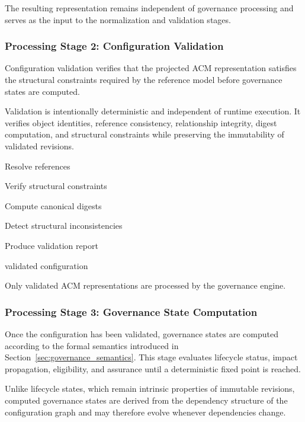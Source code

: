 \documentclass[10pt]{article}
\begin{document}
The resulting representation remains independent of governance processing and serves as the input to the normalization and validation stages.

\subsubsection{Processing Stage 2: Configuration Validation}

Configuration validation verifies that the projected ACM representation satisfies the structural constraints required by the reference model before governance states are computed.

Validation is intentionally deterministic and independent of runtime execution. It verifies object identities, reference consistency, relationship integrity, digest computation, and structural constraints while preserving the immutability of validated revisions.

\begin{algorithm}[ht]
\caption{Configuration Validation}

Resolve references\;

Verify structural constraints\;

Compute canonical digests\;

Detect structural inconsistencies\;

Produce validation report\;

\Return validated configuration\;

\end{algorithm}

Only validated ACM representations are processed by the governance engine.

\subsubsection{Processing Stage 3: Governance State Computation}

Once the configuration has been validated, governance states are computed according to the formal semantics introduced in Section~\ref{sec:governance_semantics}. This stage evaluates lifecycle status, impact propagation, eligibility, and assurance until a deterministic fixed point is reached.

Unlike lifecycle states, which remain intrinsic properties of immutable revisions, computed governance states are derived from the dependency structure of the configuration graph and may therefore evolve whenever dependencies change.
\end{document}
